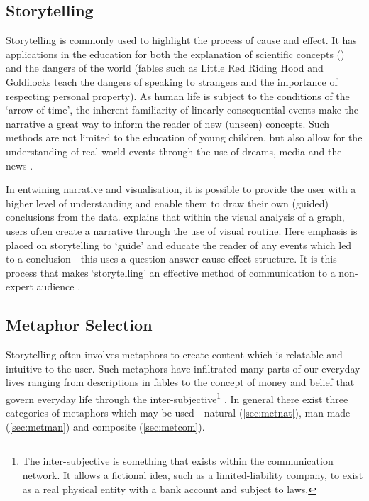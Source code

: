%



\subsection{Storytelling}\label{sec:storytelling}

Storytelling is commonly used to highlight the process of cause and effect. It has applications in the education for both the explanation of scientific concepts (\citep{marsstory}) and the dangers of the world (fables such as Little Red Riding Hood and Goldilocks teach the dangers of speaking to strangers and the importance of respecting personal property). As human life is subject to the conditions of the `arrow of time', the inherent familiarity of linearly consequential events make the narrative a great way to inform the reader of new (unseen) concepts. Such methods are not limited to the education of young children, but also allow for the understanding of real-world events through the use of dreams, media and the news \citep{storyanimal,dream}.

In entwining narrative and visualisation, it is possible to provide the user with a higher level of understanding and enable them to draw their own (guided) conclusions from the data. \cite{eyestory} explains that within the visual analysis of a graph, users often create a narrative through the use of visual routine. Here emphasis is placed on storytelling to `guide' and educate the reader of any events which led to a conclusion - this uses a question-answer cause-effect structure. It is this process that makes `storytelling' an effective method of communication to a non-expert audience \citep{nonscientific}.


\subsection{Metaphor Selection}\label{sec:metaphor}
Storytelling often involves metaphors to create content which is relatable and intuitive to the user. Such metaphors have infiltrated many parts of our everyday lives ranging from descriptions in fables to the concept of money and belief that govern everyday life through the inter-subjective\footnote{The inter-subjective is something that exists within the communication network. It allows a fictional idea, such as a limited-liability company, to exist as a real physical entity with a bank account and subject to laws. } \citep{sapiens}. In general there exist three categories of metaphors which may be used - natural (\autoref{sec:metnat}), man-made (\autoref{sec:metman}) and composite (\autoref{sec:metcom}).

